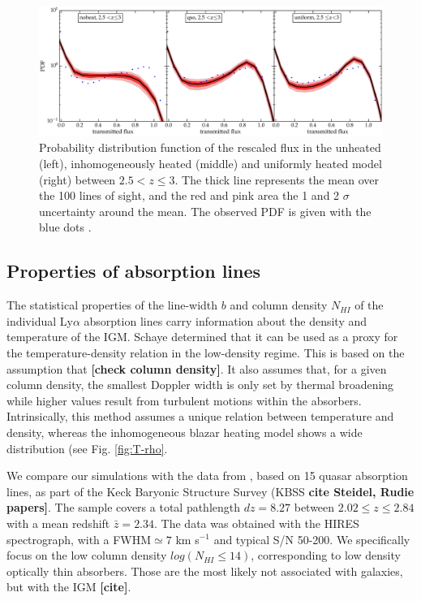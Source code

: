 \documentclass[numberedappendix]{emulateapj}
\newcommand\ALc[1]{{\color{red} \bf #1}} %
\begin{document}
\begin{figure}[h]
\centering
\includegraphics[width = .9\textwidth ]{PDF_allz_100lines}
\caption{Probability distribution function of the rescaled flux in the unheated (left), inhomogeneously heated (middle) and uniformly heated model (right) between $2.5 <z\leq 3$. The thick line represents the mean over the 100 lines of sight, and the red and pink area the 1 and 2 $\sigma$ uncertainty around the mean. The observed PDF is given with the blue dots \citet{2017MNRAS.466.2690R}. }
\label{fig:PDF_A}
\end{figure}


\subsection{Properties of absorption lines}

The statistical properties of the line-width $b$  and column density $N_{HI}$ of the individual Ly$\alpha$ absorption lines carry information about the density and temperature of the IGM. Schaye determined that it can be used as a proxy for the temperature-density relation in the low-density regime. This is based on the assumption that \ALc{[check column density]}. It also assumes that, for a given column density, the smallest Doppler width is only set by thermal broadening while higher values result from turbulent motions within the absorbers. Intrinsically, this method assumes a unique relation between temperature and density, whereas the inhomogeneous blazar heating model shows a wide distribution (see Fig. \ref{fig:T-rho}. 

We compare our simulations with the data from \citet{2012ApJ...757L..30R}, based on 15 quasar absorption lines, as part of the Keck Baryonic Structure Survey (KBSS \ALc{cite Steidel, Rudie papers]}. The sample covers a total pathlength $dz=8.27$ between $2.02\leq z \leq 2.84$ with a mean redshift $\bar{z}=2.34$. The data was obtained with the HIRES spectrograph, with a FWHM$\simeq 7$ km s$^{-1}$ and typical S/N 50-200.  We specifically focus on the low column density $log(N_{HI} \leq 14)$, corresponding to low density optically thin absorbers. Those are the most likely not associated with galaxies, but with the IGM \ALc{[cite]}. 
\end{document}
